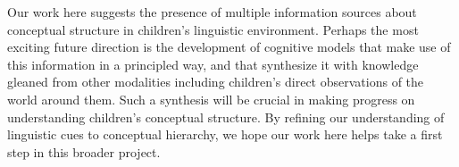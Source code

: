 \documentclass[10pt, letterpaper]{article}
\begin{document}
Our work here suggests the presence of multiple information sources about conceptual structure in children's linguistic environment. Perhaps the most exciting future direction is the development of cognitive models that make use of this information in a principled way, and that synthesize it with knowledge gleaned from other modalities including children's direct observations of the world around them. Such a synthesis will be crucial in making progress on understanding children's conceptual structure. By refining our understanding of linguistic cues to conceptual hierarchy, we hope our work here helps take a first step in this broader project. 




\setlength{\bibleftmargin}{.125in}
\setlength{\bibindent}{-\bibleftmargin}


\end{document}
